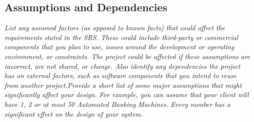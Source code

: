     \subsection{Assumptions and Dependencies}\label{sec:assumptions-dependencies}
        \emph{List any assumed factors (as opposed to known facts) that could affect the requirements stated in the SRS. These could include third-party or commercial components that you plan to use, issues around the development or operating environment, or constraints. The project could be affected if these assumptions are incorrect, are not shared, or change. Also identify any dependencies the project has on external factors, such as software components that you intend to reuse from another project.\gnl Provide a short list of some major assumptions that might significantly affect your design. For example, you can assume that your client will have 1, 2 or at most 50 Automated Banking Machines. Every number has a significant effect on the design of your system.}
